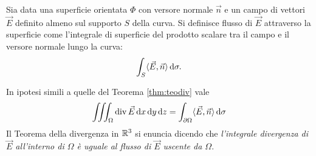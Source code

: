 \begin{definition}
	Sia data una superficie orientata $ \Phi $ con versore normale $ \vec{n} $ e un campo di vettori $ \vec{E} $ definito almeno sul supporto $ S $ della curva. Si definisce flusso di $ \vec{E} $ attraverso la superficie come l'integrale di superficie del prodotto scalare tra il campo e il versore normale lungo la curva: 
	\[
		\int_{S} \langle {\vec{E}, \vec{n}} \rangle \dif{\sigma}.
	\]
\end{definition}

\begin{thm}
	In ipotesi simili a quelle del Teorema \ref{thm:teodiv} vale
	\begin{equation}
		\iiint_{\Omega} \div{\vec{E}} \dif{x} \dif{y} \dif{z} = \int_{\partial \Omega} \langle {\vec{E}, \vec{n}} \rangle \dif{\sigma}
	\end{equation}
	Il Teorema della divergenza in $ \mathbb{R}^3 $ si enuncia dicendo che \emph{l'integrale divergenza di $ \vec{E} $ all'interno di $ \Omega $ è uguale al flusso di $ \vec{E} $ uscente da $ \Omega $}. 
\end{thm}
